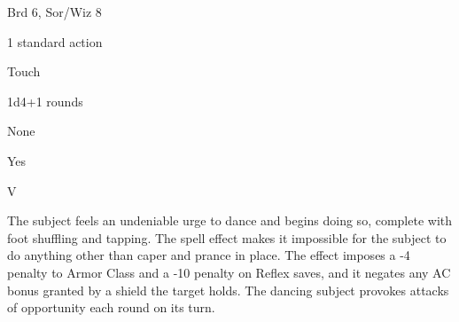 
\begin{description*}
\item[Level:] Brd 6, Sor/Wiz 8
\item[Casting Time:] 1 standard action
\item[Range:] Touch
\item[Duration:] 1d4+1 rounds
\item[Saving Throw:] None
\item[Spell Resistance:] Yes
\item[Components:] V
\end{description*}

The subject feels an undeniable urge to dance and begins doing so, complete with
foot shuffling and tapping. The spell effect makes it impossible for the subject
to do anything other than caper and prance in place. The effect imposes a -4 penalty
to Armor Class and a -10 penalty on Reflex saves, and it negates any AC bonus granted
by a shield the target holds. The dancing subject provokes attacks of opportunity
each round on its turn.